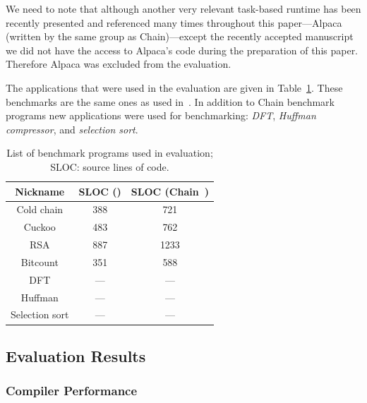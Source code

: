 We need to note that although another very relevant task-based runtime has been recently presented and referenced many times throughout this paper---Alpaca~\cite{alpaca} (written by the same group as Chain)---except the recently accepted manuscript we did not have the access to Alpaca's code during the preparation of this paper. Therefore Alpaca was excluded from the evaluation.


The applications that were used in the evaluation are given in Table~\ref{table:benchmark_list}. These benchmarks are the same ones as used in~\cite{chain,alpaca}. In addition to Chain benchmark programs new applications were used for benchmarking: \emph{DFT}, \emph{Huffman compressor}, and \emph{selection sort}.

\begin{table}[t]
	\begin{tabular}{|c|c|c|}
		\hline
		Nickname & SLOC (\sys) & SLOC (Chain~\cite{chain})\\
		\hline\hline
		Cold chain & 388 & 721 \\ %
		Cuckoo & 483 & 762 \\ %
		RSA & 887 & 1233 \\ %
		Bitcount & 351 & 588 \\ %
		DFT & --- & --- \\ %
		Huffman & --- & --- \\ %
		Selection sort & --- & --- \\
		\hline
	\end{tabular}
\caption{List of benchmark programs used in \sys evaluation; SLOC: source lines of code.}
\label{table:benchmark_list}
\end{table}


\subsection{Evaluation Results}
\label{sec:results_evaluation}

\subsubsection{Compiler Performance}
\label{sec:results_compiler}

